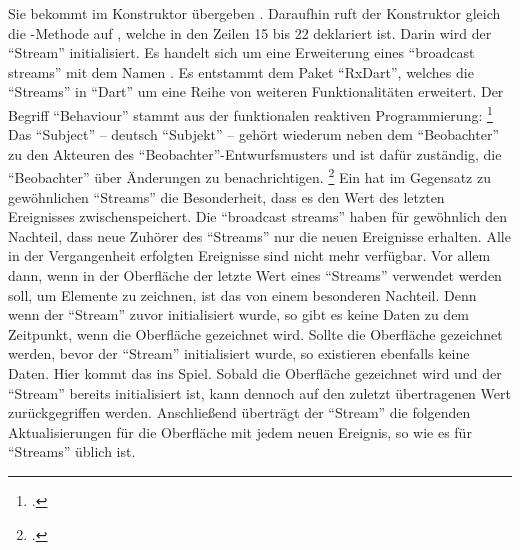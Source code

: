 Sie bekommt  im Konstruktor übergeben .
Daraufhin ruft der Konstruktor gleich die -Methode auf , welche in den Zeilen 15 bis 22 deklariert ist.
Darin wird der \enquote{Stream}   initialisiert.
Es handelt sich um eine Erweiterung eines \enquote{broadcast streams} mit dem Namen  .
Es entstammt dem Paket \enquote{RxDart},
welches die \enquote{Streams} in \enquote{Dart} um eine Reihe von weiteren Funktionalitäten erweitert.
Der Begriff \enquote{Behaviour} stammt aus der funktionalen reaktiven Programmierung:
\footcite[][S. 1]{ElliottHudak97:Fran}
Das \enquote{Subject}
-- deutsch \enquote{Subjekt} --
gehört wiederum neben dem \enquote{Beobachter} zu den Akteuren des \enquote{Beobachter}-Entwurfsmusters
und ist dafür zuständig, die \enquote{Beobachter} über Änderungen zu benachrichtigen.
\footcite[Vgl.][S. 288]{gamma2009entwurfsmuster}
Ein  hat im Gegensatz zu gewöhnlichen \enquote{Streams} die Besonderheit,
dass es den Wert des letzten Ereignisses zwischenspeichert.
Die \enquote{broadcast streams} haben für gewöhnlich den Nachteil,
dass neue Zuhörer des \enquote{Streams} nur die neuen Ereignisse erhalten.
Alle in der Vergangenheit erfolgten Ereignisse sind nicht mehr verfügbar.
Vor allem dann,
wenn in der Oberfläche der letzte Wert eines \enquote{Streams} verwendet werden soll,
um Elemente zu zeichnen,
ist das von einem besonderen Nachteil.
Denn wenn der \enquote{Stream} zuvor initialisiert wurde,
so gibt es keine Daten zu dem Zeitpunkt,
wenn die Oberfläche gezeichnet wird.
Sollte die Oberfläche gezeichnet werden,
bevor der \enquote{Stream} initialisiert wurde,
so  existieren ebenfalls keine Daten.
Hier kommt das  ins Spiel.
Sobald die Oberfläche gezeichnet wird und der \enquote{Stream} bereits initialisiert ist,
kann dennoch auf den zuletzt übertragenen Wert zurückgegriffen werden.
Anschließend überträgt der \enquote{Stream} die folgenden Aktualisierungen für die Oberfläche mit jedem neuen Ereignis,
so wie es für \enquote{Streams} üblich ist.


